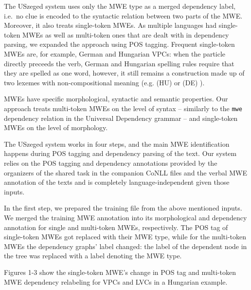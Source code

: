 \documentclass[output=paper,
modfonts,
]{langscibook}
\begin{document}
The USzeged system uses only the MWE type as a merged dependency label, i.e.~no clue is encoded to the syntactic relation between two parts of the MWE. Moreover, it also treats single-token MWEs. As multiple languages had single-token MWEs as well as multi-token ones that are dealt with in dependency parsing, we expanded the approach using POS tagging. Frequent single-token MWEs are, for example, German and Hungarian VPCs: when the particle directly preceeds the verb, German and Hungarian spelling rules require that they are spelled as one word, however, it still remains a construction made up of two lexemes with non-compositional meaning (e.g. (HU)  or (DE) ). 

MWEs have specific morphological, syntactic and semantic properties. Our approach treats multi-token MWEs on the level of syntax -- similarly to the \texttt{mwe} dependency relation in the Universal Dependency grammar \citep{NivreTAU15} -- and single-token MWEs on the level of morphology.

The USzeged system works in four steps, and the main MWE identification happens during POS tagging and dependency parsing of the text. Our system relies on the POS tagging and dependency annotations provided by the organizers of the shared task in the companion CoNLL files and the verbal MWE annotation of the texts and is completely language-independent given those inputs.

In the first step, we prepared the training file from the above mentioned inputs. We merged the training MWE annotation into its morphological and dependency annotation for single and multi-token MWEs, respectively. The POS tag of single-token MWEs got replaced with their MWE type, while for the multi-token MWEs the dependency graphs' label changed: the label of the dependent node in the tree was replaced with a label denoting the MWE type. 

Figures 1-3 show the single-token MWE's change in POS tag and multi-token MWE dependency relabeling for VPCs and LVCs in a Hungarian example.
\end{document}
